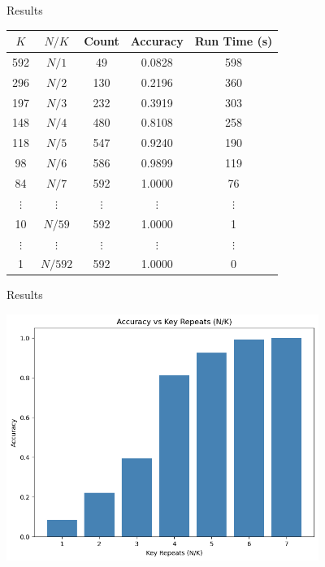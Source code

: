 \documentclass{beamer}
\begin{document}
\begin{frame}{Results}

\begin{center}
\begin{tabular}{ccccc}
\hline
$K$ & $N/K$ & Count & Accuracy & Run Time (s) \\
\hline
592 & $N/1$ & 49   & 0.0828 & 598 \\
296 & $N/2$ & 130  & 0.2196 & 360 \\
197 & $N/3$ & 232  & 0.3919 & 303 \\
148 & $N/4$ & 480  & 0.8108 & 258 \\
118 & $N/5$ & 547  & 0.9240 & 190 \\
98  & $N/6$ & 586  & 0.9899 & 119 \\
84  & $N/7$ & 592  & 1.0000 & 76  \\
$\vdots$ & $\vdots$ & $\vdots$ & $\vdots$ & $\vdots$ \\
10  & $N/59$  & 592 & 1.0000 & 1   \\
$\vdots$ & $\vdots$ & $\vdots$ & $\vdots$ & $\vdots$ \\
1   & $N/592$ & 592 & 1.0000 & 0   \\
\hline
\end{tabular}
\end{center}

\end{frame}


\begin{frame}{Results}

\begin{center} \includegraphics[width=4in]{images/experiment.png} \end{center}

\end{frame}
\end{document}
